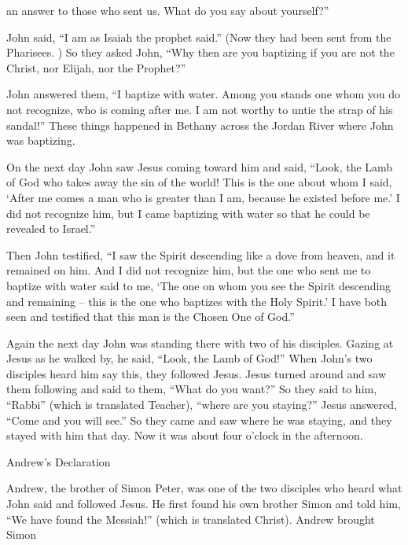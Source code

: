 {an answer
to those who sent
us.
What
do you say
about
yourself?”
\par }{\PP {}John said,
“I
am
{}
as
Isaiah
the prophet
said.”
(Now
they had been
sent
from
the Pharisees. )
So
they asked
John, “Why
then
are you baptizing
if
you
are
not
the Christ,
nor
Elijah,
nor
the Prophet?”
\par }{\PP {}John
answered
them, “I
baptize
with
water.
Among
you
stands
one whom
you
do
not
recognize,
who is coming
after
me.
I
am
not
worthy
to
untie
the strap
of his
sandal!”
These things
happened
in
Bethany
across
the Jordan River
where
John
was baptizing.
\par }{\PP {}On the next day
John saw
Jesus
coming
toward
him
and
said,
“Look,
the Lamb
of God
who takes away
the sin
of the world!
This
is
the one about
whom
I
said,
‘After
me
comes
a man
who
is greater
than I
am, because
he existed
before
me.’
I
did
not
recognize
him,
but
I
came
baptizing
with
water
so that
he could be revealed
to Israel.”
\par }{\PP {}Then
John
testified, “I saw
the Spirit
descending
like
a dove
from
heaven,
and
it remained
on
him.
And I
did
not
recognize
him,
but
the one who sent
me
to baptize
with
water
said
to me,
‘The one
on
whom
you see
the Spirit
descending
and
remaining
– this
is
the one who baptizes
with
the Holy
Spirit.’
I
have
both
seen
and
testified
that
this man
is
the Chosen One
of God.”
\par }{\PP {}Again
the next day
John
was standing
there with two
of
his
disciples.
Gazing
at Jesus
as
he walked by,
he said,
“Look,
the Lamb
of God!”
When
John’s two
disciples
heard
him
say
this, they followed
Jesus.
Jesus
turned around
and
saw
them
following
and said
to them,
“What
do you want?” So
they said
to him,
“Rabbi”
(which
is translated
Teacher), “where
are you staying?”
Jesus answered, “Come
and
you will see.”
So
they came
and
saw
where
he was staying,
and
they stayed
with
him
that
day.
Now it was
about
four
o’clock
in the afternoon.
\par }{\SH Andrew’s Declaration
\par }{\PP {}Andrew,
the brother
of Simon
Peter,
was
one
of the two
disciples who heard
what John
said and
followed
Jesus.
He
first
found
his own
brother
Simon
and
told
him,
“We have found
the Messiah!” (which
is
translated
Christ).
Andrew brought
Simon
}
